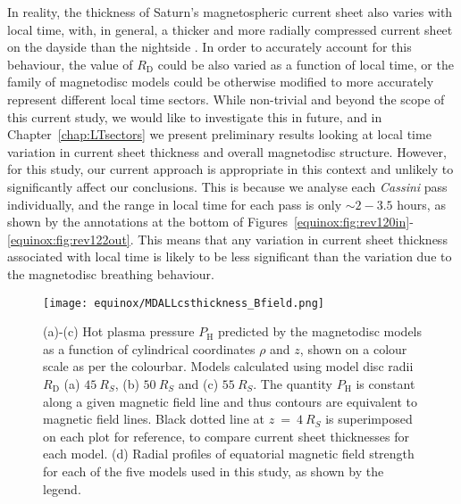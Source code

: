 In reality, the thickness of Saturn's magnetospheric current sheet also varies with local time, with, in general, a thicker and more radially compressed current sheet on the dayside than the nightside \citep[e.g.][]{arridge2008}. In order to accurately account for this behaviour, the value of $R_\mathrm{D}$ could be also varied as a function of local time, or the family of magnetodisc models could be otherwise modified to more accurately represent different local time sectors. While non-trivial and beyond the scope of this current study, we would like to investigate this in future, and in Chapter~\ref{chap:LTsectors} we present preliminary results looking at local time variation in current sheet thickness and overall magnetodisc structure. However, for this study, our current approach is appropriate in this context and unlikely to significantly affect our conclusions. This is because we analyse each \textit{Cassini} pass individually, and the range in local time for each pass is only $\sim2-3.5$ hours, as shown by the annotations at the bottom of Figures~\ref{equinox:fig:rev120in}{\--}\ref{equinox:fig:rev122out}. This means that any variation in current sheet thickness associated with local time is likely to be less significant than the variation due to the magnetodisc breathing behaviour.
\begin{figure}
\centering
\texttt{[image: equinox/MDALLcsthickness\_Bfield.png]}
\caption[Magnetic field structure for $R_\mathrm{D}$ = $45, 50$ and $\SI{55}{R_S}$ magnetodisc models.]{(a)-(c) Hot plasma pressure $P_\mathrm{H}$ predicted by the magnetodisc models as a function of cylindrical coordinates $\rho$ and $z$, shown on a colour scale as per the colourbar. Models calculated using model disc radii $R_\mathrm{D}$ (a) $\SI{45}{R_S}$, (b) $\SI{50}{R_S}$ and (c) $\SI{55}{R_S}$. The quantity $P_\mathrm{H}$ is constant along a given magnetic field line and thus contours are equivalent to magnetic field lines. Black dotted line at $z~{=}~\SI{4}{R_S}$ is superimposed on each plot for reference, to compare current sheet thicknesses for each model. (d) Radial profiles of equatorial magnetic field strength for each of the five models used in this study, as shown by the legend.}
\label{equinox:fig:MDALLcsthickness}
\end{figure}

